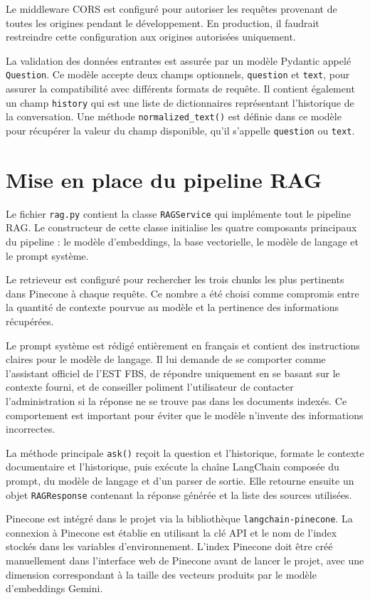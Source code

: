 \documentclass[12pt, a4paper, twoside]{report}
\begin{document}
Le middleware CORS est configuré pour autoriser les requêtes provenant de toutes les origines pendant le développement. En production, il faudrait restreindre cette configuration aux origines autorisées uniquement.

La validation des données entrantes est assurée par un modèle Pydantic appelé \texttt{Question}. Ce modèle accepte deux champs optionnels, \texttt{question} et \texttt{text}, pour assurer la compatibilité avec différents formats de requête. Il contient également un champ \texttt{history} qui est une liste de dictionnaires représentant l'historique de la conversation. Une méthode \texttt{normalized\_text()} est définie dans ce modèle pour récupérer la valeur du champ disponible, qu'il s'appelle \texttt{question} ou \texttt{text}.

\section{Mise en place du pipeline RAG}
Le fichier \texttt{rag.py} contient la classe \texttt{RAGService} qui implémente tout le pipeline RAG. Le constructeur de cette classe initialise les quatre composants principaux du pipeline : le modèle d'embeddings, la base vectorielle, le modèle de langage et le prompt système.

Le retrieveur est configuré pour rechercher les trois chunks les plus pertinents dans Pinecone à chaque requête. Ce nombre a été choisi comme compromis entre la quantité de contexte pourvue au modèle et la pertinence des informations récupérées.

Le prompt système est rédigé entièrement en français et contient des instructions claires pour le modèle de langage. Il lui demande de se comporter comme l'assistant officiel de l'EST FBS, de répondre uniquement en se basant sur le contexte fourni, et de conseiller poliment l'utilisateur de contacter l'administration si la réponse ne se trouve pas dans les documents indexés. Ce comportement est important pour éviter que le modèle n'invente des informations incorrectes.

La méthode principale \texttt{ask()} reçoit la question et l'historique, formate le contexte documentaire et l'historique, puis exécute la chaîne LangChain composée du prompt, du modèle de langage et d'un parser de sortie. Elle retourne ensuite un objet \texttt{RAGResponse} contenant la réponse générée et la liste des sources utilisées.

Pinecone est intégré dans le projet via la bibliothèque \texttt{langchain-pinecone}. La connexion à Pinecone est établie en utilisant la clé API et le nom de l'index stockés dans les variables d'environnement. L'index Pinecone doit être créé manuellement dans l'interface web de Pinecone avant de lancer le projet, avec une dimension correspondant à la taille des vecteurs produits par le modèle d'embeddings Gemini.
\end{document}
